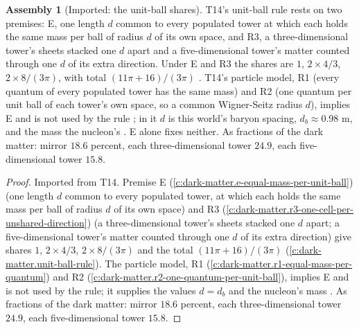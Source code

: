 \documentclass[11pt]{article}
\theoremstyle{definition}
\newtheorem{assembled}[theorem]{Assembly}
\theoremstyle{plain}
\newcommand{\changedmark}[2]{\marginpar{\raggedright\scriptsize\color{#1}#2}}
\begin{document}
\begin{assembled}[Imported: the unit-ball shares]\label{c:dark-tower-matter.imported-unit-ball-rule}
\changedmark{BurntOrange}{changed since the deposit}
T14's unit-ball rule rests on two premises: E, one length $d$ common to every populated tower at which each holds the same mass per ball of radius $d$ of its own space, and R3, a three-dimensional tower's sheets stacked one $d$ apart and a five-dimensional tower's matter counted through one $d$ of its extra direction. Under E and R3 the shares are $1$, $2 \times 4/3$, $2 \times 8/(3\pi)$, with total $(11\pi + 16)/(3\pi)$ \cite[Prem.~7.2, Prem.~7.4, Prop.~7.6(i)]{ButlerT14}. T14's particle model, R1 (every quantum of every populated tower has the same mass) and R2 (one quantum per unit ball of each tower's own space, so a common Wigner-Seitz radius $d$), implies E and is not used by the rule \cite[Prem.~7.3, Prop.~7.6(ii)]{ButlerT14}; in it $d$ is this world's baryon spacing, $d_{b} \approx 0.98$ m, and the mass the nucleon's \cite[Rem.~7.9, Cor.~7.26]{ButlerT14}. E alone fixes neither. As fractions of the dark matter: mirror $18.6$ percent, each three-dimensional tower $24.9$, each five-dimensional tower $15.8$.
\end{assembled}
\begin{proof}
Imported from T14. Premise E (\ref{c:dark-matter.e-equal-mass-per-unit-ball}) (one length $d$ common to every populated tower, at which each holds the same mass per ball of radius $d$ of its own space) and R3 (\ref{c:dark-matter.r3-one-cell-per-unshared-direction}) (a three-dimensional tower's sheets stacked one $d$ apart; a five-dimensional tower's matter counted through one $d$ of its extra direction) give shares $1$, $2 \times 4/3$, $2 \times 8/(3\pi)$ and the total $(11\pi + 16)/(3\pi)$ \cite[Prem.~7.2, Prem.~7.4, Prop.~7.6(i)]{ButlerT14} (\ref{c:dark-matter.unit-ball-rule}). The particle model, R1 (\ref{c:dark-matter.r1-equal-mass-per-quantum}) and R2 (\ref{c:dark-matter.r2-one-quantum-per-unit-ball}), implies E and is not used by the rule; it supplies the values $d = d_{b}$ and the nucleon's mass \cite[Prem.~7.3, Prop.~7.6(ii)]{ButlerT14}. As fractions of the dark matter: mirror $18.6$ percent, each three-dimensional tower $24.9$, each five-dimensional tower $15.8$.

\end{proof}
\end{document}
